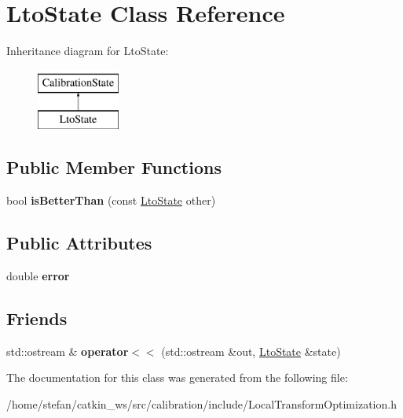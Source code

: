 \hypertarget{classLtoState}{\section{\-Lto\-State \-Class \-Reference}
\label{classLtoState}
}
\-Inheritance diagram for \-Lto\-State\-:\begin{figure}[H]
\begin{center}
\leavevmode
\includegraphics[height=2.000000cm]{classLtoState}
\end{center}
\end{figure}
\subsection*{\-Public \-Member \-Functions}
\begin{DoxyCompactItemize}
\item 
\hypertarget{classLtoState_ac65f1437c32321adae036a236e8e7518}{bool {\bfseries is\-Better\-Than} (const \hyperlink{classLtoState}{\-Lto\-State} other)}\label{classLtoState_ac65f1437c32321adae036a236e8e7518}

\end{DoxyCompactItemize}
\subsection*{\-Public \-Attributes}
\begin{DoxyCompactItemize}
\item 
\hypertarget{classLtoState_a792b3fe57dc114e874423d91ada33bc5}{double {\bfseries error}}\label{classLtoState_a792b3fe57dc114e874423d91ada33bc5}

\end{DoxyCompactItemize}
\subsection*{\-Friends}
\begin{DoxyCompactItemize}
\item 
\hypertarget{classLtoState_a1e00afe1953a5ecdede47a1a77bb0aff}{std\-::ostream \& {\bfseries operator$<$$<$} (std\-::ostream \&out, \hyperlink{classLtoState}{\-Lto\-State} \&state)}\label{classLtoState_a1e00afe1953a5ecdede47a1a77bb0aff}

\end{DoxyCompactItemize}


\-The documentation for this class was generated from the following file\-:\begin{DoxyCompactItemize}
\item 
/home/stefan/catkin\-\_\-ws/src/calibration/include/\-Local\-Transform\-Optimization.\-h\end{DoxyCompactItemize}
